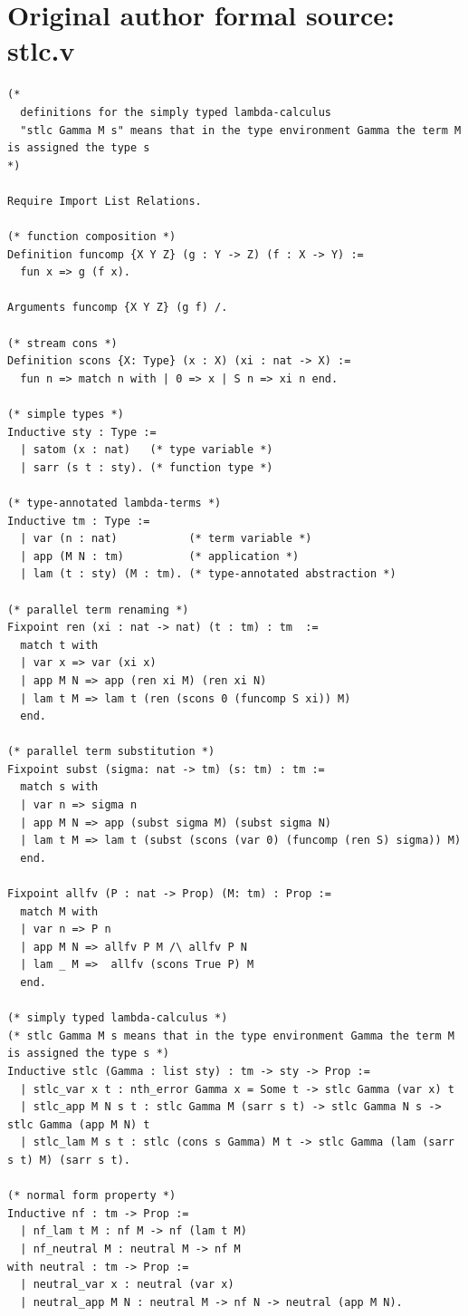 \section*{Original author formal source: stlc.v}
\begin{lstlisting}[style=authorcoq]
(*
  definitions for the simply typed lambda-calculus
  "stlc Gamma M s" means that in the type environment Gamma the term M is assigned the type s
*)

Require Import List Relations.

(* function composition *)
Definition funcomp {X Y Z} (g : Y -> Z) (f : X -> Y) :=
  fun x => g (f x).

Arguments funcomp {X Y Z} (g f) /.

(* stream cons *)
Definition scons {X: Type} (x : X) (xi : nat -> X) :=
  fun n => match n with | 0 => x | S n => xi n end.

(* simple types *)
Inductive sty : Type :=
  | satom (x : nat)   (* type variable *)
  | sarr (s t : sty). (* function type *)

(* type-annotated lambda-terms *)
Inductive tm : Type :=
  | var (n : nat)           (* term variable *)
  | app (M N : tm)          (* application *)
  | lam (t : sty) (M : tm). (* type-annotated abstraction *)

(* parallel term renaming *)
Fixpoint ren (xi : nat -> nat) (t : tm) : tm  :=
  match t with
  | var x => var (xi x)
  | app M N => app (ren xi M) (ren xi N)
  | lam t M => lam t (ren (scons 0 (funcomp S xi)) M)
  end.

(* parallel term substitution *)
Fixpoint subst (sigma: nat -> tm) (s: tm) : tm :=
  match s with
  | var n => sigma n
  | app M N => app (subst sigma M) (subst sigma N)
  | lam t M => lam t (subst (scons (var 0) (funcomp (ren S) sigma)) M)
  end.

Fixpoint allfv (P : nat -> Prop) (M: tm) : Prop :=
  match M with
  | var n => P n
  | app M N => allfv P M /\ allfv P N
  | lam _ M =>  allfv (scons True P) M
  end.

(* simply typed lambda-calculus *)
(* stlc Gamma M s means that in the type environment Gamma the term M is assigned the type s *)
Inductive stlc (Gamma : list sty) : tm -> sty -> Prop :=
  | stlc_var x t : nth_error Gamma x = Some t -> stlc Gamma (var x) t
  | stlc_app M N s t : stlc Gamma M (sarr s t) -> stlc Gamma N s -> stlc Gamma (app M N) t
  | stlc_lam M s t : stlc (cons s Gamma) M t -> stlc Gamma (lam (sarr s t) M) (sarr s t).

(* normal form property *)
Inductive nf : tm -> Prop :=
  | nf_lam t M : nf M -> nf (lam t M)
  | nf_neutral M : neutral M -> nf M
with neutral : tm -> Prop :=
  | neutral_var x : neutral (var x)
  | neutral_app M N : neutral M -> nf N -> neutral (app M N).


\end{lstlisting}
